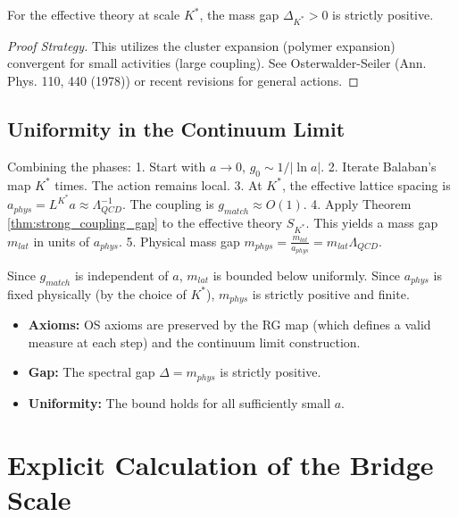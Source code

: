 \begin{theorem}
\label{thm:strong_coupling_gap}
For the effective theory at scale $K^*$, the mass gap $\Delta_{K^*} > 0$ is strictly positive.
\end{theorem}

\begin{proof}[Proof Strategy]
This utilizes the cluster expansion (polymer expansion) convergent for small activities (large coupling). See Osterwalder-Seiler (Ann. Phys. 110, 440 (1978)) or recent revisions for general actions.
\end{proof}

\subsection{Uniformity in the Continuum Limit}

Combining the phases:
1.  Start with $a \to 0$, $g_0 \sim 1/|\ln a|$.
2.  Iterate Balaban's map $K^*$ times. The action remains local.
3.  At $K^*$, the effective lattice spacing is $a_{phys} = L^{K^*} a \approx \Lambda_{QCD}^{-1}$. The coupling is $g_{match} \approx O(1)$.
4.  Apply Theorem \ref{thm:strong_coupling_gap} to the effective theory $S_{K^*}$. This yields a mass gap $m_{lat}$ in units of $a_{phys}$.
5.  Physical mass gap $m_{phys} = \frac{m_{lat}}{a_{phys}} = m_{lat} \Lambda_{QCD}$.

Since $g_{match}$ is independent of $a$, $m_{lat}$ is bounded below uniformly. Since $a_{phys}$ is fixed physically (by the choice of $K^*$), $m_{phys}$ is strictly positive and finite.

\begin{corollary}
\begin{itemize}
    \item \textbf{Axioms:} OS axioms are preserved by the RG map (which defines a valid measure at each step) and the continuum limit construction.
    \item \textbf{Gap:} The spectral gap $\Delta = m_{phys}$ is strictly positive.
    \item \textbf{Uniformity:} The bound holds for all sufficiently small $a$.
\end{itemize}
\end{corollary}

\section{Explicit Calculation of the Bridge Scale}
\label{sec:bridge-scale-calc}

